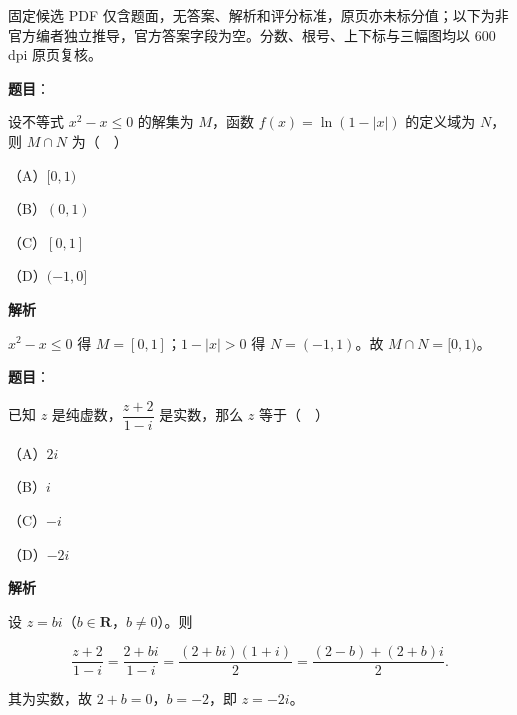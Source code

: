 

\begin{gktip}
固定候选 PDF 仅含题面，无答案、解析和评分标准，原页亦未标分值；以下为非官方编者独立推导，官方答案字段为空。分数、根号、上下标与三幅图均以 600 dpi 原页复核。
\end{gktip}

\begin{answer}

\textbf{题目}：

设不等式 $x^2-x\leqslant0$ 的解集为 $M$，函数 $f(x)=\ln(1-|x|)$ 的定义域为 $N$，则 $M\cap N$ 为（　）

（A）$[0,1)$

（B）$(0,1)$

（C）$[0,1]$

（D）$(-1,0]$

\textbf{解析}

$x^2-x\leqslant0$ 得 $M=[0,1]$；$1-|x|>0$ 得 $N=(-1,1)$。故 $M\cap N=[0,1)$。


\end{answer}
\begin{answer}

\textbf{题目}：

已知 $z$ 是纯虚数，$\dfrac{z+2}{1-i}$ 是实数，那么 $z$ 等于（　）

（A）$2i$

（B）$i$

（C）$-i$

（D）$-2i$

\textbf{解析}

设 $z=bi$（$b\in\mathbf R$，$b\neq0$）。则

\nopagebreak[4]
\[\frac{z+2}{1-i}=\frac{2+bi}{1-i}=\frac{(2+bi)(1+i)}2
=\frac{(2-b)+(2+b)i}2.\]

其为实数，故 $2+b=0$，$b=-2$，即 $z=-2i$。


\end{answer}
